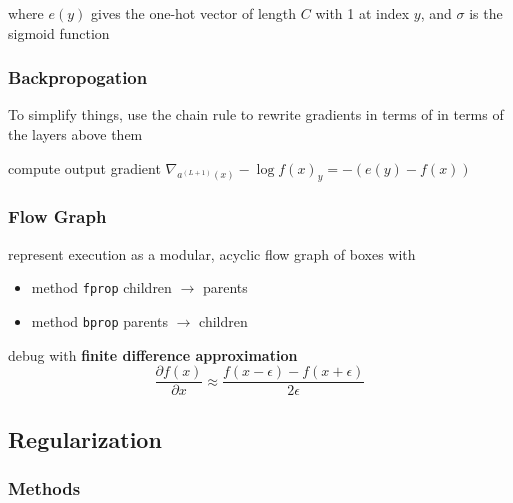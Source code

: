 \documentclass[]{article}
\begin{document}
where $e(y)$ gives the one-hot vector of length $C$ with 1 at index $y$, and $\sigma$ is the sigmoid function


\subsubsection{Backpropogation}%
\label{ssub:backpropogation}

To simplify things, use the chain rule to rewrite gradients in terms of in terms of the layers above them

\begin{algorithm}[H]
    \BlankLine
    \DontPrintSemicolon
    compute output gradient $\nabla_{a^{(L+1)}(x)} - \log f(x)_y = -(e(y) - f(x))$ \;
\end{algorithm}

\subsubsection{Flow Graph}%
\label{ssub:flow_graph}
represent execution as a modular, acyclic flow graph of boxes with
\begin{itemize}
    \item method \texttt{fprop} children $\to$ parents
    \item method \texttt{bprop} parents $\to$ children
\end{itemize}
debug with \textbf{finite difference approximation}
\begin{equation*}
    \frac{\partial f(x)}{\partial x} \approx \frac{f(x - \epsilon) - f(x + \epsilon)}{2\epsilon}
\end{equation*}

\subsection{Regularization}%
\label{sub:regularization}

\subsubsection{Methods}%
\label{ssub:methods}
\end{document}
